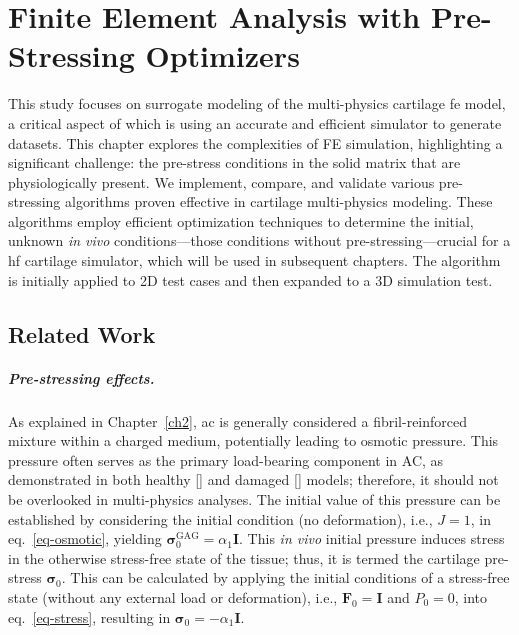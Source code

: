 \documentclass[12pt,a4paper]{report}
\begin{document}
\chapter{Finite Element Analysis with Pre-Stressing Optimizers}\label{ch3}

This study focuses on surrogate modeling of the multi-physics cartilage \ac{fe} model, a critical aspect of which is using an accurate and efficient simulator to generate datasets. This chapter explores the complexities of FE simulation, highlighting a significant challenge: the pre-stress conditions in the solid matrix that are physiologically present. We implement, compare, and validate various pre-stressing algorithms proven effective in cartilage multi-physics modeling. These algorithms employ efficient optimization techniques to determine the initial, unknown \textit{in vivo} conditions—those conditions without pre-stressing—crucial for a \ac{hf} cartilage simulator, which will be used in subsequent chapters. The algorithm is initially applied to 2D test cases and then expanded to a 3D simulation test.

\section{Related Work}

\paragraph{Pre-stressing effects.} As explained in Chapter~\ref{ch2}, \ac{ac} is generally considered a fibril-reinforced mixture within a charged medium, potentially leading to osmotic pressure. This pressure often serves as the primary load-bearing component in AC, as demonstrated in both healthy [\cite{quiroga2017}] and damaged [\cite{sajjadinia2019}] models; therefore, it should not be overlooked in multi-physics analyses. The initial value of this pressure can be established by considering the initial condition (no deformation), i.e., $J = 1$, in eq.~\ref{eq-osmotic}, yielding $\boldsymbol{\sigma}^{\text{GAG}}_0 = \alpha_1 \mathbf{I}$. This \textit{in vivo} initial pressure induces stress in the otherwise stress-free state of the tissue; thus, it is termed the cartilage pre-stress $\boldsymbol{\sigma}_0$. This can be calculated by applying the initial conditions of a stress-free state (without any external load or deformation), i.e., $\textbf{F}_0=\textbf{I}$ and $P_0 = 0$, into eq.~\ref{eq-stress}, resulting in $\boldsymbol{\sigma}_0 = -\alpha_1 \mathbf{I}$.
\end{document}
